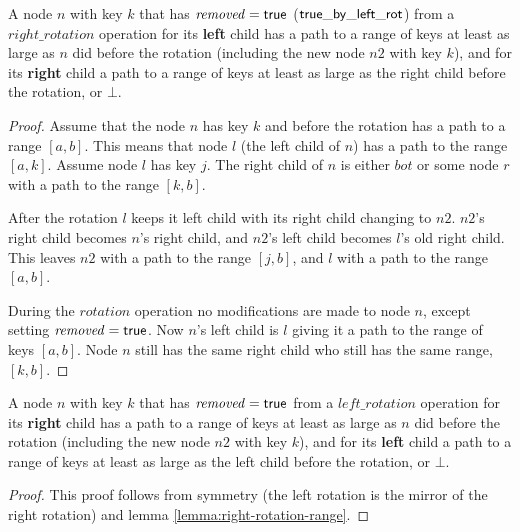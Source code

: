 \begin{lemma}
\label{lemma:right-rotation-range}
A node $n$ with key $k$ that has $\ms{removed}=\lit{true}$ ($\lit{true\_by\_left\_rot}$) from a $right\_rotation$ operation for its \textbf{left} child has a path to a range of keys at least as large as 
$n$ did before the rotation (including the new node $n2$ with key $k$), and for its \textbf{right} child
a path to a range of keys at least as large as the right child before the rotation, or $\bot$.
\end{lemma}
\begin{proof}
Assume that the node $n$ has key $k$ and before the rotation has a path to a range $[a, b]$.
This means that node $l$ (the left child of $n$) has a path to the range $[a, k]$.
Assume node $l$ has key $j$.
The right child of $n$ is either $bot$ or some node $r$ with a path to the range $[k, b]$.

After the rotation $l$ keeps it left child with its right child changing to $n2$.
$n2$'s right child becomes $n$'s right child, and $n2$'s left child becomes $l$'s old right child.
This leaves $n2$ with a path to the range $[j, b]$, and $l$ with a path to the range $[a, b]$.

During the $rotation$ operation no modifications are made to node $n$, except setting $\ms{removed}=\lit{true}$.
Now $n$'s left child is $l$ giving it a path to the range of keys $[a, b]$.
Node $n$ still has the same right child who still has the same range, $[k, b]$.
\end{proof}



\begin{lemma}
\label{lemma:left-rotation-range}
A node $n$ with key $k$ that has $\ms{removed}=\lit{true}$ from a $left\_rotation$ operation for its \textbf{right} child has a path to a range of keys at least as large as
$n$ did before the rotation (including the new node $n2$ with key $k$), and for its \textbf{left} child
a path to a range of keys at least as large as the left child before the rotation, or $\bot$.
\end{lemma}
\begin{proof}
This proof follows from symmetry (the left rotation is the mirror of the right rotation) and lemma \ref{lemma:right-rotation-range}.
\end{proof}


